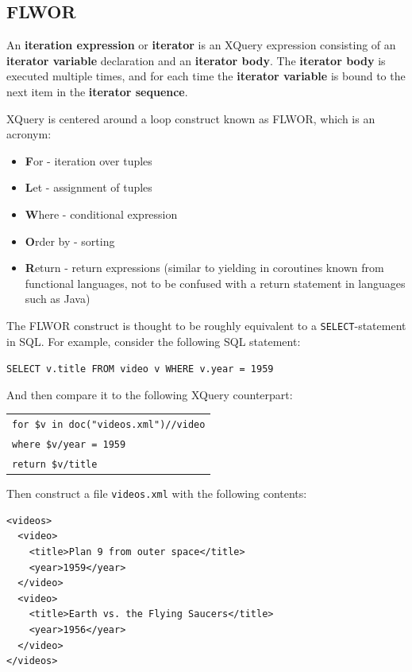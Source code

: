 \subsection{FLWOR}
\label{sect:theory:xquery:Flwor}

\begin{myDefinition}
\label{definition:iteration_expression}
An \textbf{iteration expression} or \textbf{iterator} is an XQuery expression consisting of an \textbf{iterator
variable} declaration and an \textbf{iterator body}. The \textbf{iterator body} is executed multiple times, and
for each time the \textbf{iterator variable} is bound to the next item in the \textbf{iterator sequence}.
\end{myDefinition}

XQuery is centered around a loop construct known as FLWOR, which is an acronym:
\begin{itemize}
  \item \textbf{F}or - iteration over tuples
  \item \textbf{L}et - assignment of tuples
  \item \textbf{W}here - conditional expression
  \item \textbf{O}rder by - sorting 
  \item \textbf{R}eturn - return expressions (similar to yielding in coroutines
  known from functional languages, not to be confused with a return statement
  in languages such as Java)
\end{itemize}
The FLWOR construct is thought to be roughly equivalent to a
\texttt{SELECT}-statement in SQL. For example, consider the following SQL
statement: 
\begin{center}
\verb!SELECT v.title FROM video v WHERE v.year = 1959!
\end{center}
And then compare it to the following XQuery counterpart:
\begin{center}
\begin{tabular}{l}
\texttt{for \$v in doc("videos.xml")//video} \\
\texttt{where \$v/year = 1959}\\
\texttt{return \$v/title}\\
\end{tabular}
\end{center}
Then construct a file \texttt{videos.xml} with the following contents:
\begin{center}
\begin{minipage}[h]{9.5cm}
\begin{verbatim}
<videos>
  <video>
    <title>Plan 9 from outer space</title>
    <year>1959</year>
  </video>
  <video>
    <title>Earth vs. the Flying Saucers</title>
    <year>1956</year>
  </video>
</videos>
\end{verbatim}
\end{minipage}
\end{center}

